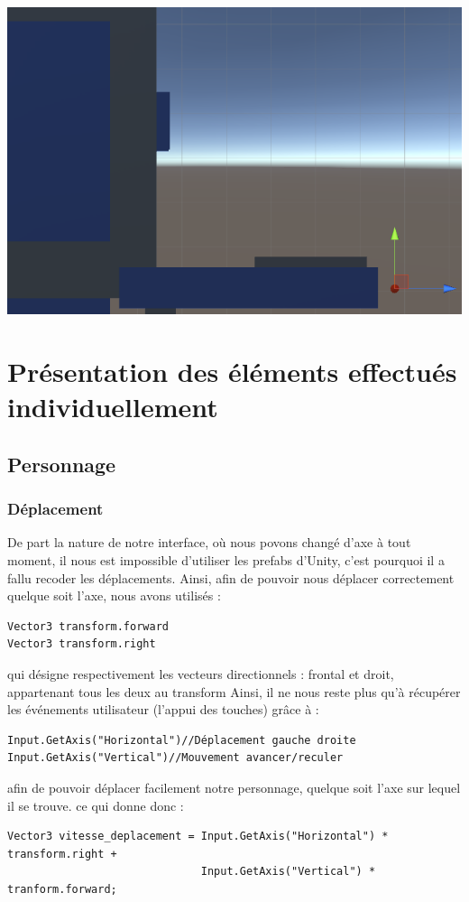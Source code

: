 ﻿\documentclass{article}
\begin{document}
\centerline{\includegraphics[scale=1.0]{empty.png}}


\section{Présentation des éléments effectués individuellement}
\subsection {Personnage}
\subsubsection{Déplacement}
De part la nature de notre interface, où nous povons changé d'axe à tout moment,
il nous est impossible d'utiliser les prefabs d'Unity, c'est pourquoi il a fallu
recoder les déplacements.
Ainsi, afin de pouvoir nous déplacer correctement quelque soit l'axe, nous avons utilisés :
\begin{verbatim}
Vector3 transform.forward
Vector3 transform.right
\end{verbatim}
qui désigne respectivement les vecteurs directionnels : frontal et droit, appartenant tous les deux au transform
Ainsi, il ne nous reste plus qu'à récupérer les événements utilisateur (l'appui des touches) grâce à :
\begin{verbatim}
Input.GetAxis("Horizontal")//Déplacement gauche droite
Input.GetAxis("Vertical")//Mouvement avancer/reculer
\end{verbatim}

afin de pouvoir déplacer facilement notre personnage, quelque soit l'axe sur lequel il se trouve.
ce qui donne donc :
\begin{verbatim}
Vector3 vitesse_deplacement = Input.GetAxis("Horizontal") * transform.right +
							  Input.GetAxis("Vertical") * tranform.forward;
\end{verbatim}
\end{document}
